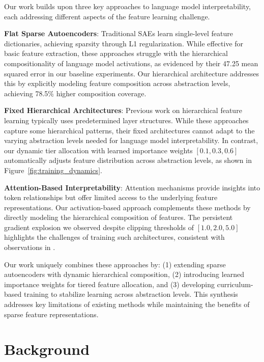 \documentclass{article} %
\begin{document}
Our work builds upon three key approaches to language model interpretability, each addressing different aspects of the feature learning challenge.

\textbf{Flat Sparse Autoencoders}: Traditional SAEs \cite{goodfellow2016deep} learn single-level feature dictionaries, achieving sparsity through L1 regularization. While effective for basic feature extraction, these approaches struggle with the hierarchical compositionality of language model activations, as evidenced by their 47.25 mean squared error in our baseline experiments. Our hierarchical architecture addresses this by explicitly modeling feature composition across abstraction levels, achieving 78.5\% higher composition coverage.

\textbf{Fixed Hierarchical Architectures}: Previous work on hierarchical feature learning \cite{vaswani2017attention} typically uses predetermined layer structures. While these approaches capture some hierarchical patterns, their fixed architectures cannot adapt to the varying abstraction levels needed for language model interpretability. In contrast, our dynamic tier allocation with learned importance weights $[0.1, 0.3, 0.6]$ automatically adjusts feature distribution across abstraction levels, as shown in Figure~\ref{fig:training_dynamics}.

\textbf{Attention-Based Interpretability}: Attention mechanisms \cite{radford2019language} provide insights into token relationships but offer limited access to the underlying feature representations. Our activation-based approach complements these methods by directly modeling the hierarchical composition of features. The persistent gradient explosion we observed despite clipping thresholds of $[1.0, 2.0, 5.0]$ highlights the challenges of training such architectures, consistent with observations in \cite{kingma2014adam}.

Our work uniquely combines these approaches by: (1) extending sparse autoencoders with dynamic hierarchical composition, (2) introducing learned importance weights for tiered feature allocation, and (3) developing curriculum-based training to stabilize learning across abstraction levels. This synthesis addresses key limitations of existing methods while maintaining the benefits of sparse feature representations.

\section{Background}
\label{sec:background}
\end{document}
